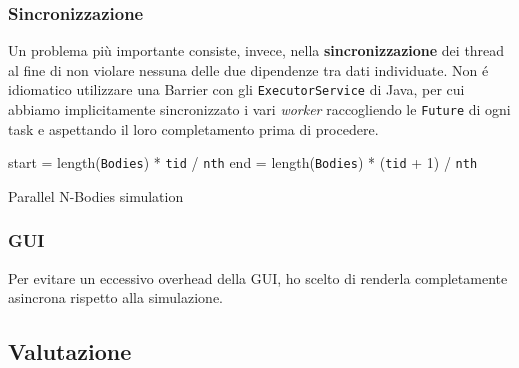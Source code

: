\documentclass[12pt,a4paper,oneside]{article}
\begin{document}
	\subsubsection{Sincronizzazione}
	Un problema più importante consiste, invece, nella \textbf{sincronizzazione} dei thread al fine di non violare nessuna delle due dipendenze tra dati individuate. Non \'e idiomatico utilizzare una Barrier con gli \texttt{ExecutorService} di Java, per cui abbiamo implicitamente sincronizzato i vari \textit{worker} raccogliendo le \texttt{Future} di ogni task e aspettando il loro completamento prima di procedere.
	
	\begin{algorithm}
		
		start = length(\texttt{Bodies}) * \texttt{tid} / \texttt{nth}\;
		end = length(\texttt{Bodies}) * (\texttt{tid} + 1) / \texttt{nth}\;
		\caption{Parallel N-Bodies simulation}
		\label{alg:sim-barrier}
	\end{algorithm}

	\subsubsection{GUI}
	Per evitare un eccessivo overhead della GUI, ho scelto di renderla completamente asincrona rispetto alla simulazione.
	
	\subsection{Valutazione}
\end{document}
